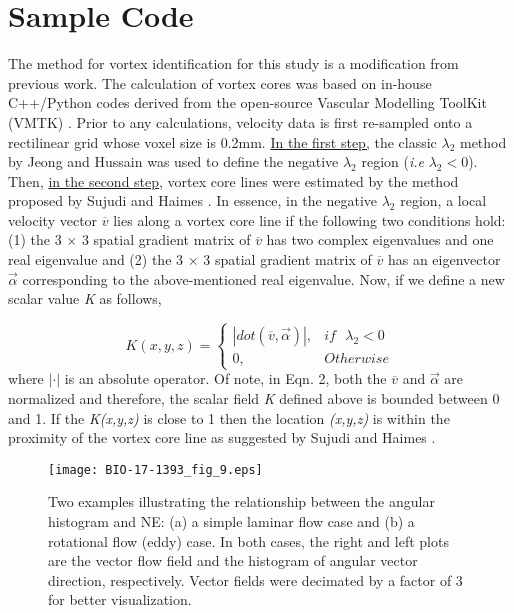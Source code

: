 \cleartooddpage[\thispagestyle{empty}]
\chapter{Sample Code}\label{APPENDIXB}

The method for vortex identification for this study is a modification from previous work\cite{sunderland2016vortex}. The calculation of vortex cores was based on in-house C++/Python codes derived from the open-source Vascular Modelling ToolKit (VMTK) \cite{antiga2004robust}. Prior to any calculations, velocity data is first re-sampled onto a rectilinear grid whose voxel size is 0.2mm. \newline
\underline{In the first step,} the classic $\lambda_2$ method by Jeong and Hussain \cite{jeong1995identification} was used to define the negative $\lambda_2$ region (\textit{i.e} $\lambda_2 < 0$). Then, \underline{in the second step}, vortex core lines were estimated by the method proposed by Sujudi and Haimes \cite{sujudi1995identification}. In essence, in the negative $\lambda_2$ region, a local velocity vector $\overline{v}$ lies along a vortex core line if the following two conditions hold: (1) the 3 $\times$ 3 spatial gradient matrix of $\overline{v}$ has two complex eigenvalues and one real eigenvalue and (2) the 3 $\times$ 3 spatial gradient matrix of $\overline{v}$ has an eigenvector $\vec{\alpha}$ corresponding to the above-mentioned real eigenvalue. Now, if we define a new scalar value \textit{K} as follows,

	\begin{equation}
	K(x,y,z) =
	\begin{cases}
	|dot(\overline{v},\vec{\alpha})|, & if \text{ $\lambda_2$}  < 0 \\
	0, & Otherwise
	\end{cases}
	\end{equation}
where $|\cdot|$ is an absolute operator. Of note, in Eqn. 2, both the $\overline{v}$ and $\vec{\alpha}$ are normalized and therefore, the scalar field \textit{K} defined above is bounded between 0 and 1. If the \textit{K(x,y,z)} is close to 1 then the location \textit{(x,y,z)} is within the proximity of the vortex core line as suggested by Sujudi and Haimes \cite{sujudi1995identification}. 

\begin{figure}[t]
\begin{center}
\texttt{[image: BIO-17-1393\_fig\_9.eps]}
\end{center}
\caption{Two examples illustrating the relationship between the angular histogram and NE: (a) a simple laminar flow case and (b) a rotational flow (eddy) case. In both cases, the right and left plots are the vector flow field and the histogram of angular vector direction, respectively. Vector fields were decimated by a factor of 3 for better visualization.}
\label{NE} 
\end{figure} 
	
